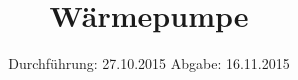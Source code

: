 

\subject{V206}
\title{Wärmepumpe}
\date{
  Durchführung: 27.10.2015
  \hspace{3em}
  Abgabe: 16.11.2015
}



\maketitle
\thispagestyle{empty}
\tableofcontents
\newpage









\printbibliography


